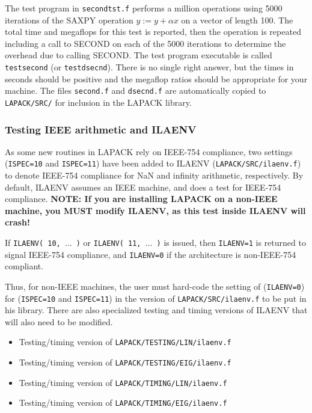 \documentclass[11pt]{report}
\begin{document}
The test program in \texttt{secondtst.f}
performs a million operations using 5000 iterations of 
the SAXPY operation $y := y + \alpha x$ on a vector of length 100.
The total time and megaflops for this test is reported, then
the operation is repeated including a call to SECOND on each of
the 5000 iterations to determine the overhead due to calling SECOND.
The test program executable is called \texttt{testsecond} (or \texttt{testdsecnd}).
There is no single right answer, but the times
in seconds should be positive and the megaflop ratios should be 
appropriate for your machine.
The files \texttt{second.f} and \texttt{dsecnd.f} are automatically copied to
\texttt{LAPACK/SRC/} for inclusion in the LAPACK library.

\subsubsection{Testing IEEE arithmetic and ILAENV}\label{testieee}


As some new routines in LAPACK rely on IEEE-754 compliance,
two settings (\texttt{ISPEC=10} and \texttt{ISPEC=11}) have been added to ILAENV
(\texttt{LAPACK/SRC/ilaenv.f}) to denote IEEE-754 compliance for NaN and
infinity arithmetic, respectively.  By default, ILAENV assumes an IEEE
machine, and does a test for IEEE-754 compliance.  \textbf{NOTE:  If you
are installing LAPACK on a non-IEEE machine, you MUST modify ILAENV,
as this test inside ILAENV will crash!}

If \texttt{ILAENV( 10, $\ldots$ )} or \texttt{ILAENV( 11, $\ldots$ )} is 
issued, then \texttt{ILAENV=1} is returned to signal IEEE-754 compliance,
and \texttt{ILAENV=0} if the architecture is non-IEEE-754 compliant.

Thus, for non-IEEE machines, the user must hard-code the setting of
(\texttt{ILAENV=0}) for (\texttt{ISPEC=10} and \texttt{ISPEC=11}) in the version
of \texttt{LAPACK/SRC/ilaenv.f} to be put in
his library.  There are also specialized testing and timing versions of
ILAENV that will also need to be modified.
\begin{itemize}
\item Testing/timing version of \texttt{LAPACK/TESTING/LIN/ilaenv.f}
\item Testing/timing version of \texttt{LAPACK/TESTING/EIG/ilaenv.f}
\item Testing/timing version of \texttt{LAPACK/TIMING/LIN/ilaenv.f}
\item Testing/timing version of \texttt{LAPACK/TIMING/EIG/ilaenv.f}
\end{itemize}
\end{document}
